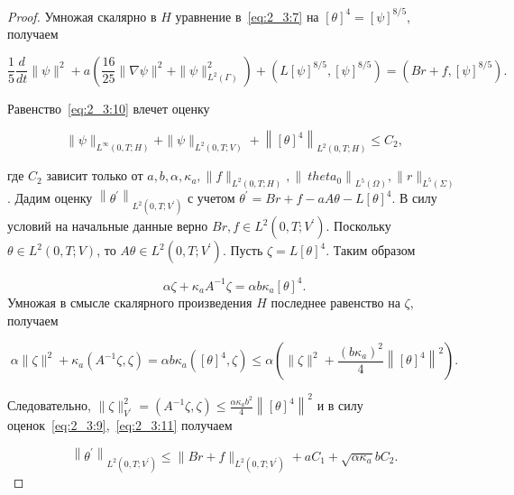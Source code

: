 \begin{proof}
    Умножая скалярно в $H$ уравнение в~\eqref{eq:2_3:7}
    на $[\theta]^{4}=[\psi]^{8 / 5}$, получаем

    \begin{equation}
        \label{eq:2_3:10}
        \frac{1}{5} \frac{d}{d t}\|\psi\|^{2}+a\left(\frac{16}{25}\|\nabla \psi\|^{2}
        + \|\psi\|_{L^{2}(\Gamma)}^{2}\right)+
        \left(L[\psi]^{8 / 5},[\psi]^{8 / 5}\right)=\left(B r+f,[\psi]^{8 / 5}\right).
    \end{equation}

    Равенство~\eqref{eq:2_3:10} влечет оценку

    \begin{equation}
        \label{eq:2_3:11}
        \|\psi\|_{L^{\infty}(0, T ; H)}+\|\psi\|_{L^{2}(0, T ; V)}+
        \left\|[\theta]^{4}\right\|_{L^{2}(0, T ; H)} \leq C_{2},
    \end{equation}

    где $C_{2}$ зависит только от
    $a, b, \alpha, \kappa_{a},\|f\|_{L^{2}(0, T ; H)},
    \left\|\ theta_{0}\right\|_{L^{5}(\Omega)},\|r\|_{L^{5}(\Sigma)}$.
    Дадим оценку
    $\left\|\theta^{\prime}\right\|_{L^{2}\left(0, T ; V^{\prime}\right)}$
    с учетом $ \theta^{\prime}=B r+f-a A \theta-L[\theta]^{4}$.
    В силу условий на начальные данные верно
    $B r, f \in L^{2}\left(0, T ; V^{\prime}\right)$.
    Поскольку $\theta \in L^{2}(0, T ; V)$,
    то $A \theta \in L^{2}\left(0, T ; V^{\prime}\right)$.
    Пусть $\zeta=L[\theta]^{4}$.
    Таким образом

    \[
        \alpha \zeta+\kappa_{a} A^{-1} \zeta=\alpha b \kappa_{a}[\theta]^{4}.
    \]
    Умножая в смысле скалярного произведения $H$
    последнее равенство на $\zeta$, получаем

    \[
        \alpha\|\zeta\|^{2}+\kappa_{a}\left(A^{-1} \zeta,
        \zeta\right)=\alpha b \kappa_{a}\left([\theta]^{4},
        \zeta\right) \leq \alpha\left(\|\zeta\|^{2}
        +\frac{\left(b \kappa_{a}\right)^{2}}{4}\left\|
        [\theta]^{4}\right\|^{2}\right).
    \]


    Следовательно, $\|\zeta\|_{V^{\prime}}^{2}=\left(A^{-1} \zeta,
    \zeta\right) \leq \frac{\alpha \kappa_{ a} b^{2}}{4}\left\|[\theta]^{4}\right\|^{2}$
    и в силу оценок~\eqref{eq:2_3:9},~\eqref{eq:2_3:11} получаем

    \begin{equation}
        \label{eq:2_3:12}
        \left\|\theta^{\prime}\right\|_{L^{2}\left(0, T; V^{\prime}\right)}
        \leq\|B r+f\|_{L^{2}\left(0, T ; V^{\prime}\right)}+a C_{1}+\sqrt{\alpha \kappa_{a}} b C_{2}.
    \end{equation}



\end{proof}
